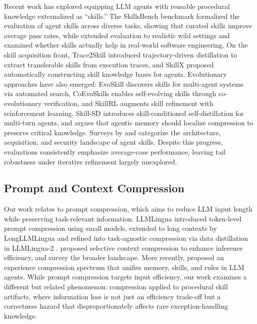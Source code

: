 \documentclass[11pt]{article}
\begin{document}
Recent work has explored equipping LLM agents with reusable procedural knowledge externalized as ``skills.'' The SkillsBench benchmark \citep{li2026skillsbench} formalized the evaluation of agent skills across diverse tasks, showing that curated skills improve average pass rates, while \citet{liu2026wildskills} extended evaluation to realistic wild settings and \citet{han2026swe} examined whether skills actually help in real-world software engineering. On the skill acquisition front, Trace2Skill \citep{ni2026trace2skill} introduced trajectory-driven distillation to extract transferable skills from execution traces, and SkillX \citep{wang2026skillx} proposed automatically constructing skill knowledge bases for agents. Evolutionary approaches have also emerged: EvoSkill \citep{alzubi2026evoskill} discovers skills for multi-agent systems via automated search, CoEvoSkills \citep{zhang2026coevoskills} enables self-evolving skills through co-evolutionary verification, and SkillRL \citep{xia2026skillrl} augments skill refinement with reinforcement learning. Skill-SD \citep{wang2026skillsd} introduces skill-conditioned self-distillation for multi-turn agents, and \citet{inhar2026localize} argues that agentic memory should localize compression to preserve critical knowledge. Surveys by \citet{jiang2026sok} and \citet{xu2026agent} categorize the architecture, acquisition, and security landscape of agent skills. Despite this progress, evaluations consistently emphasize average-case performance, leaving tail robustness under iterative refinement largely unexplored.

\subsection{Prompt and Context Compression}

Our work relates to prompt compression, which aims to reduce LLM input length while preserving task-relevant information. LLMLingua \citep{jiang2023llmlingua} introduced token-level prompt compression using small models, extended to long contexts by LongLLMLingua \citep{jiang2024longllmlingua} and refined into task-agnostic compression via data distillation in LLMLingua-2 \citep{pan2024llmlingua2}. \citet{li2023selectivecontext} proposed selective context compression to enhance inference efficiency, and \citet{li2025promptcompression} survey the broader landscape. More recently, \citet{zhang2026experiencecompression} proposed an experience compression spectrum that unifies memory, skills, and rules in LLM agents. While prompt compression targets input efficiency, our work examines a different but related phenomenon: compression applied to procedural skill artifacts, where information loss is not just an efficiency trade-off but a correctness hazard that disproportionately affects rare exception-handling knowledge.
\end{document}
